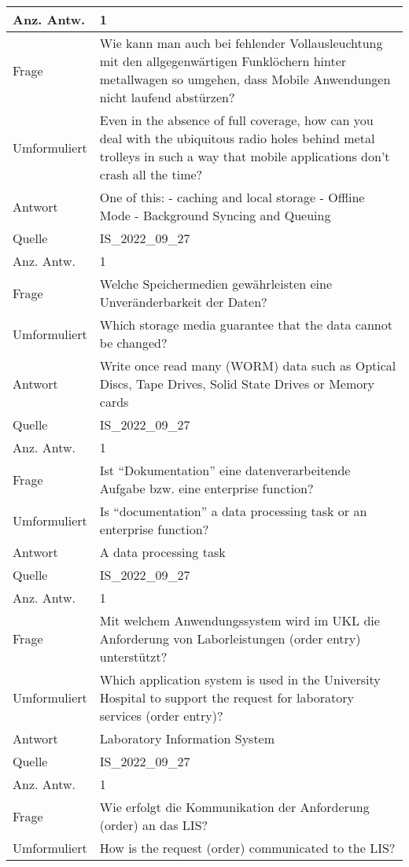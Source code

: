 \begin{landscape}
\begin{longtable}{p{3cm}p{}}
    Anz. Antw.& 1 \\
    \midrule
    Frage & Wie kann man auch bei fehlender Vollausleuchtung mit den allgegenwärtigen Funklöchern hinter metallwagen so umgehen, dass Mobile Anwendungen nicht laufend abstürzen? \\
    Umformuliert & Even in the absence of full coverage, how can you deal with the ubiquitous radio holes behind metal trolleys in such a way that mobile applications don't crash all the time? \\
    Antwort & One of this:
    - caching and local storage
    - Offline Mode
    - Background Syncing and Queuing \\
    Quelle & IS\_2022\_09\_27 \\
    Anz. Antw.& 1 \\
    \midrule
    Frage & Welche Speichermedien gewährleisten eine Unveränderbarkeit der Daten? \\
    Umformuliert & Which storage media guarantee that the data cannot be changed? \\
    Antwort & Write once read many (WORM) data such as Optical Discs, Tape Drives, Solid State Drives or Memory cards \\
    Quelle & IS\_2022\_09\_27 \\
    Anz. Antw.& 1 \\
    \midrule
    Frage & Ist ``Dokumentation'' eine datenverarbeitende Aufgabe bzw.
    eine enterprise function? \\
    Umformuliert & Is ``documentation'' a data processing task or an enterprise function? \\
    Antwort & A data processing task \\
    Quelle & IS\_2022\_09\_27 \\
    Anz. Antw.& 1 \\
    \midrule
    Frage & Mit welchem Anwendungssystem wird im UKL die Anforderung von Laborleistungen  (order entry) unterstützt? \\
    Umformuliert & Which application system is used in the University Hospital to support the request for laboratory services (order entry)? \\
    Antwort & Laboratory Information System \\
    Quelle & IS\_2022\_09\_27 \\
    Anz. Antw.& 1 \\
    \midrule
    Frage & Wie erfolgt die Kommunikation der Anforderung (order) an das LIS? \\
    Umformuliert & How is the request (order) communicated to the LIS? \\

\end{longtable}
\end{landscape}
